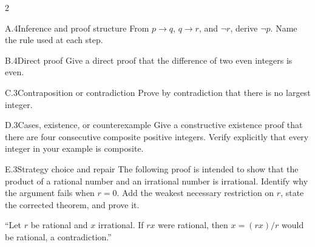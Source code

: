 \documentclass[9pt]{extarticle}
\begin{document}
\begin{multicols}{2}
\begin{CoreProblem}{A.4}{Inference and proof structure}
From $p\to q$, $q\to r$, and $\neg r$, derive $\neg p$. Name the rule used at
each step.
\end{CoreProblem}
\begin{CoreProblem}{B.4}{Direct proof}
Give a direct proof that the difference of two even integers is even.
\end{CoreProblem}
\begin{CoreProblem}{C.3}{Contraposition or contradiction}
Prove by contradiction that there is no largest integer.
\end{CoreProblem}
\columnbreak
\begin{CoreProblem}{D.3}{Cases, existence, or counterexample}
Give a constructive existence proof that there are four consecutive composite
positive integers. Verify explicitly that every integer in your example is
composite.
\end{CoreProblem}
\begin{CoreProblem}{E.3}{Strategy choice and repair}
The following proof is intended to show that the product of a rational number
and an irrational number is irrational. Identify why the argument fails when
$r=0$. Add the weakest necessary restriction on $r$, state the corrected
theorem, and prove it.

``Let $r$ be rational and $x$ irrational. If $rx$ were rational, then $x=(rx)/r$ would be rational, a contradiction.''
\end{CoreProblem}
\end{multicols}
\CoreWorkArea
\end{document}
